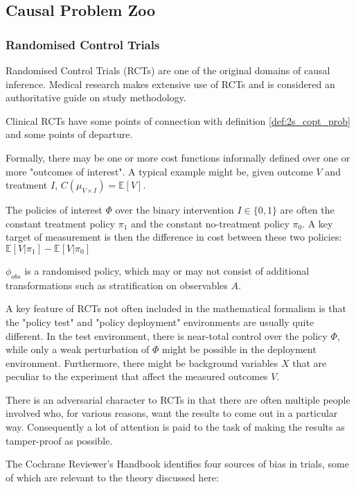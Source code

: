 \subsection{Causal Problem Zoo}

\subsubsection{Randomised Control Trials}

Randomised Control Trials (RCTs) are one of the original domains of causal inference. Medical research makes extensive use of RCTs and \cite{collaboration_cochrane_nodate} is considered an authoritative guide on study methodology.

Clinical RCTs have some points of connection with definition \ref{def:2s_copt_prob} and some points of departure. 

Formally, there may be one or more cost functions informally defined over one or more "outcomes of interest". A typical example might be, given outcome $V$ and treatment $I$, $C(\mu_{V\times I})=\mathbb{E}[V]$.

The policies of interest $\Phi$ over the binary intervention $I\in\{0,1\}$ are often the constant treatment policy $\pi_1$ and the constant no-treatment policy $\pi_0$. A key target of measurement is then the difference in cost between these two policies: $\mathbb{E}[V|\pi_1]-\mathbb{E}[V|\pi_0]$

$\phi_{obs}$ is a randomised policy, which may or may not consist of additional transformations such as stratification on observables $A$.

A key feature of RCTs  not often included in the mathematical formalism is that the "policy test" and "policy deployment" environments are usually quite different. In the test environment, there is near-total control over the policy $\Phi$, while only a weak perturbation of $\Phi$ might be possible in the deployment environment. Furthermore, there might be background variables $X$ that are peculiar to the experiment that affect the measured outcomes $V$.

There is an adversarial character to RCTs in that there are often multiple people involved who, for various reasons, want the results to come out in a particular way. Consequently a lot of attention is paid to the task of making the results as tamper-proof as possible.

The Cochrane Reviewer's Handbook identifies four sources of bias in trials, some of which are relevant to the theory discussed here:

